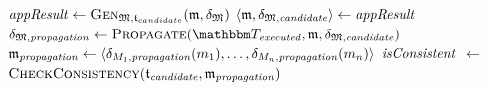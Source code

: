 \begin{algorithm}
\begin{algorithmic}[1]
         \label{algo:orchestration:provenance:line:loop_start}
            \State $\mathit{appResult} \gets \textsc{Gen}_{\mathfrak{M}, \mathfrak{t}_{candidate}}(\mathfrak{m}, \mathfrak{\delta}_{\mathfrak{M}})$ \label{algo:orchestration:provenance:line:first_execution}
                \State \Return{$\bot$} \label{algo:orchestration:provenance:line:bot_application}
            \EndIf
            \State $\langle \mathfrak{m}, \mathfrak{\delta}_{\mathfrak{M},\mathit{candidate}} \rangle \gets \mathit{appResult}$
            \State $\changetuple{\metamodeltuple{M},\mathvariable{propagation}} \gets \function{Propagate}(\provalgexecuted, \modeltuple{m}, \changetuple{\metamodeltuple{M},\mathvariable{candidate}})$ \label{algo:orchestration:provenance:line:recursive_call}
                \State \Return{$\bot$} \label{algo:orchestration:provenance:line:bot_recursion}
            \EndIf
            \State $\mathfrak{m}_{\mathit{propagation}} \gets \langle \delta_{M_{1},\mathit{propagation}}(m_{1}), \dots, \delta_{M_{n},\mathit{propagation}}(m_{n}) \rangle$
            \State $\mathit{isConsistent}$ $\leftarrow$ $\textsc{CheckConsistency}(\mathfrak{t}_{\mathit{candidate}}, \mathfrak{m}_{\mathit{propagation}})$
             \label{algo:orchestration:provenance:line:failcheck}
                \State \Return{$\bot$} \label{algo:orchestration:provenance:line:bot_nonreactiveconverging}
            \EndIf

\end{algorithmic}
\end{algorithm}
